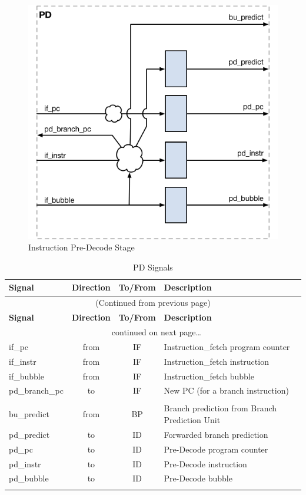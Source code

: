 \begin{figure}[th]
  \includegraphics{assets/img/Pipeline-PD.png}
  \caption{Instruction Pre-Decode Stage}
\end{figure}

\begin{longtable}[]{@{}lccl@{}}
	\toprule
	\textbf{Signal} & \textbf{Direction} & \textbf{To/From} & \textbf{Description}\tabularnewline
	\midrule
	\endfirsthead
	\multicolumn{4}{c}{{(Continued from previous page)}} \\
	\toprule
	\textbf{Signal} & \textbf{Direction} & \textbf{To/From} & \textbf{Description}\tabularnewline
	\midrule
	\endhead
	\midrule \multicolumn{4}{c}{{\tablename\ \thetable{} continued on next page\ldots}} \\
	\endfoot
	\endlastfoot
	
	if\_pc         & from &	IF	& Instruction\_fetch program counter\\
	if\_instr	   & from &	IF	& Instruction\_fetch instruction\\
	if\_bubble	   & from &	IF	& Instruction\_fetch bubble\\
	pd\_branch\_pc & to	  & IF	& New PC (for a branch instruction)\\
	\\
	bu\_predict	   & from &	BP	& Branch prediction from Branch Prediction Unit\\
	pd\_predict	   & to	  & ID	& Forwarded branch prediction\\
	pd\_pc	       & to	  & ID  & Pre-Decode program counter\\
	pd\_instr	   & to	  & ID	& Pre-Decode instruction\\
	pd\_bubble	   & to	  & ID	& Pre-Decode bubble	\\
	\bottomrule
	\caption{PD Signals}
	\label{tab:pd-signals}
\end{longtable}

